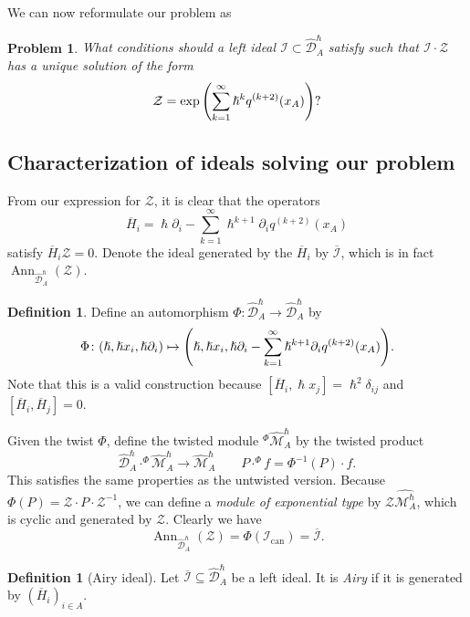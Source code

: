 \documentclass[leqno, openany]{memoir}
\newtheorem{prob}[thm]{Problem}
\theoremstyle{definition}
\newtheorem{defn}[thm]{Definition}
\theoremstyle{remark}
\theoremstyle{plain}
\theoremstyle{definition}
\theoremstyle{remark}
\newcommand{\mc}[1]{\mathcal{#1}}
\newcommand{\mr}[1]{\mathrm{#1}}
\newcommand{\on}[1]{\operatorname{#1}}
\newcommand{\ol}[1]{\overline{#1}}
\newcommand{\wh}[1]{\widehat{#1}}
\begin{document}
We can now reformulate our problem as
\begin{prob}
    What conditions should a left ideal $\mc{I} \subset \wh{\mc{D}}_A^{\hslash}$ satisfy such that $\mc{I} \cdot \mc{Z}$ has a unique solution of the form
    \begin{equation}\label{eqn:desiredsoln}
        \mc{Z} = \exp\qty(\sum_{k=1}^{\infty} \hslash^k q^{(k+2)}(x_A))? 
    \end{equation}
\end{prob}

\subsection{Characterization of ideals solving our problem}

From our expression for $\mc{Z}$, it is clear that the operators
\[ \ol{H}_i = \hslash \partial_i - \sum_{k=1}^{\infty} \hslash^{k+1} \partial_i q^{(k+2)}(x_A) \]
satisfy $\ol{H}_i \mc{Z} = 0$. Denote the ideal generated by the $\ol{H}_i$ by $\ol{\mc{I}}$, which is in fact $\on{Ann}_{\wh{\mc{D}}_A^{\hslash}}(\mc{Z})$.

\begin{defn}
    Define an automorphism $\Phi \colon \wh{\mc{D}}_A^{\hslash} \to \wh{\mc{D}}_A^{\hslash}$ by
    \[ \Phi \colon (\hslash, \hslash x_i, \hslash \partial_i) \mapsto \qty(\hslash, \hslash x_i, \hslash \partial_i - \sum_{k=1}^{\infty} \hslash^{k+1} \partial_i q^{(k+2)}(x_A)). \]
    Note that this is a valid construction because $[\ol{H}_i, \hslash x_j] = \hslash^2 \delta_{ij}$ and $[\ol{H}_i, \ol{H}_j] = 0$.
\end{defn}

Given the twist $\Phi$, define the twisted module ${}^{\Phi}\wh{\mc{M}}_A^{\hslash}$ by the twisted product
\[ \wh{\mc{D}}_A^{\hslash} \cdot^{\Phi} \wh{\mc{M}}_A^{\hslash} \to \wh{\mc{M}}_A^{\hslash} \qquad P \cdot^{\Phi} f = \Phi^{-1}(P) \cdot f. \]
This satisfies the same properties as the untwisted version. Because $\Phi(P) = \mc{Z} \cdot P \cdot \mc{Z}^{-1}$, we can define a \textit{module of exponential type} by $\mc{Z} \wh{\mc{M}_A^{\hslash}}$, which is cyclic and generated by $\mc{Z}$. Clearly we have
\[ \on{Ann}_{\wh{\mc{D}}_A^{\hslash}}(\mc{Z}) = \Phi(\mc{I}_{\mr{can}}) = \ol{\mc{I}}. \]

\begin{defn}[Airy ideal]
    Let $\ol{\mc{I}} \subseteq \wh{\mc{D}}_A^{\hslash}$ be a left ideal. It is \textit{Airy} if it is generated by $(\ol{H}_i)_{i \in A}$.
\end{defn}
\end{document}
